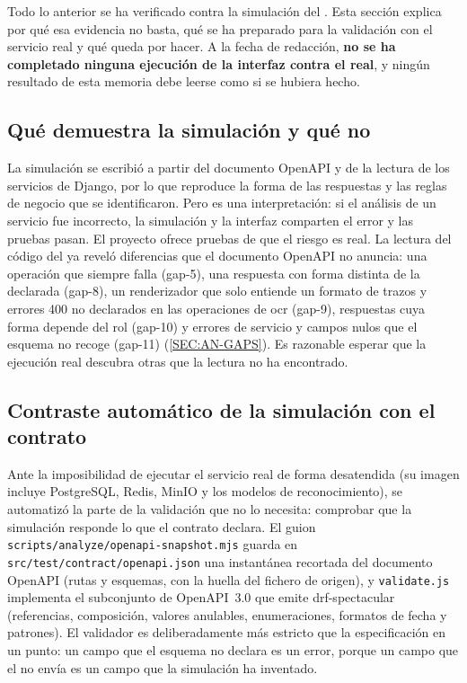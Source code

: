 Todo lo anterior se ha verificado contra la simulación del . Esta sección
explica por qué esa evidencia no basta, qué se ha preparado para la validación con el
servicio real y qué queda por hacer. A la fecha de redacción, \textbf{no se ha completado
ninguna ejecución de la interfaz contra el  real}, y ningún resultado de esta
memoria debe leerse como si se hubiera hecho.

\subsection{Qué demuestra la simulación y qué no}

La simulación se escribió a partir del documento OpenAPI y de la lectura de los servicios
de Django, por lo que reproduce la forma de las respuestas y las reglas de negocio que se
identificaron. Pero es una interpretación: si el análisis de un servicio fue incorrecto, la
simulación y la interfaz comparten el error y las pruebas pasan. El proyecto ofrece pruebas
de que el riesgo es real. La lectura del código del  ya reveló diferencias que
el documento OpenAPI no anuncia: una operación que siempre falla (gap-5), una respuesta con
forma distinta de la declarada (gap-8), un renderizador que solo entiende un formato de
trazos y errores 400 no declarados en las operaciones de \acs{ocr} (gap-9), respuestas cuya
forma depende del rol (gap-10) y errores de servicio y campos nulos que el esquema no
recoge (gap-11) (\cref{SEC:AN-GAPS}). Es razonable esperar que la ejecución real descubra
otras que la lectura no ha encontrado.

\subsection{Contraste automático de la simulación con el contrato\label{SEC:TEST-CONTRACT}}

Ante la imposibilidad de ejecutar el servicio real de forma desatendida (su imagen incluye
PostgreSQL, Redis, MinIO y los modelos de reconocimiento), se automatizó la parte de la
validación que no lo necesita: comprobar que la simulación responde lo que el contrato
declara. El guion \texttt{scripts/analyze/openapi-snapshot.mjs} guarda en
\texttt{src/test/contract/openapi.json} una instantánea recortada del documento OpenAPI
(rutas y esquemas, con la huella del fichero de origen), y \texttt{validate.js} implementa el
subconjunto de OpenAPI~3.0 que emite drf-spectacular (referencias, composición, valores
anulables, enumeraciones, formatos de fecha y patrones). El validador es deliberadamente más
estricto que la especificación en un punto: un campo que el esquema no declara es un error,
porque un campo que el  no envía es un campo que la simulación ha inventado.

